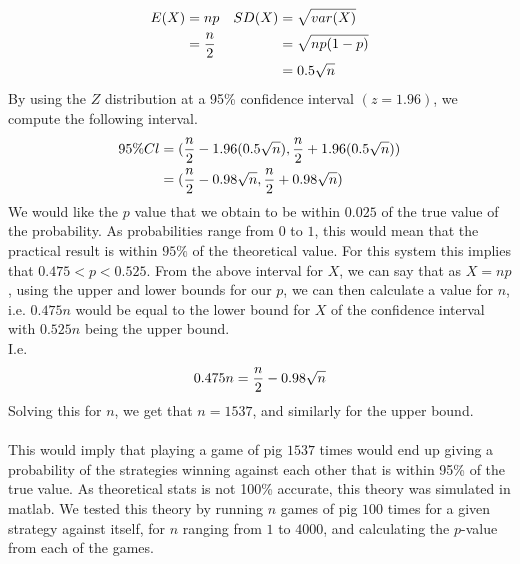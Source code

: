 \documentclass[a4paper,titlepage]{article}
\begin{document}
\begin{align}
E(X) &= np & SD(X) &= \sqrt{var(X)}\notag\\
&= \dfrac{n}{2} & &= \sqrt{np(1-p)}\notag\\
& & &= 0.5\sqrt{n} \notag
\end{align}
By using the $Z$ distribution at a 95\% confidence interval $(z=1.96)$, we compute the following interval.
\begin{align}
95\%Cl &= (\dfrac{n}{2} -1.96(0.5\sqrt{n}), \dfrac{n}{2} +1.96(0.5\sqrt{n}))\notag\\
&= (\dfrac{n}{2}-0.98\sqrt{n}, \dfrac{n}{2}+0.98\sqrt{n})
\notag
\end{align}
We would like the $p$ value that we obtain to be within $0.025$ of the true value of the probability. As probabilities range from $0$ to $1$, this would mean that the practical result is within $95\%$ of the theoretical value. For this system this implies that $0.475<p<0.525$. From the above interval for $X$, we can say that as $X=np$, using the upper and lower bounds for our $p$, we can then calculate a value for $n$, i.e. $0.475n$ would be equal to the lower bound for $X$ of the confidence interval with $0.525n$ being the upper bound.\\
I.e.
\begin{equation}
0.475n=\dfrac{n}{2}-0.98\sqrt{n}
\notag
\end{equation}
Solving this for $n$, we get that $n=1537$, and similarly for the upper bound.\\ \\
This would imply that playing a game of pig $1537$ times would end up giving a probability of the strategies winning against each other that is within 95\% of the true value. As theoretical stats is not 100\% accurate, this theory was simulated in matlab. We tested this theory by running $n$ games of pig $100$ times for a given strategy against itself, for $n$ ranging from $1$ to $4000$, and calculating the $p$-value from each of the games.\\ \\
\end{document}
